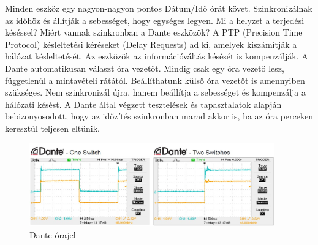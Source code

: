 Minden eszköz egy nagyon-nagyon pontos Dátum/Idő órát követ.
Szinkronizálnak az időhöz és állítják a sebességet, hogy egységes legyen.
Mi a helyzet a terjedési késéssel? Miért vannak szinkronban a Dante eszközök?
A PTP (Precision Time Protocol) késleltetési kéréseket (Delay Requests)
ad ki, amelyek kiszámítják a hálózat késleltetését. 
Az eszközök az információváltás késését is kompenzálják.
A Dante automatikusan választ óra vezetőt.
Mindig csak egy óra vezető lesz, függetlenül a mintavételi rátától.
Beállíthatunk külső óra vezetőt is amennyiben szükséges.
Nem szinkronizál újra, hanem beállítja a sebességet és kompenzálja a hálózati késést.
A Dante által végzett tesztelések és tapasztalatok alapján
bebizonyosodott, hogy az időzítés szinkronban marad akkor is,
ha az óra perceken keresztül teljesen eltűnik.

\begin{figure}[H]
	\centering
	\includegraphics[width=400px, keepaspectratio] {figures/dante-clocking.jpg}
	\caption{Dante órajel}
	\label{fig:dante-clock}
\end{figure}

